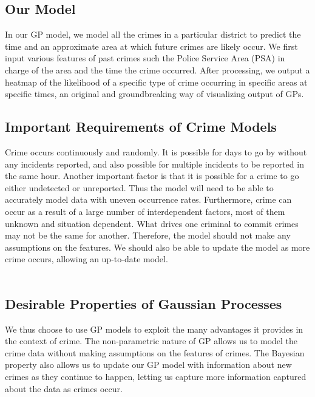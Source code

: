 \documentclass[letterpaper]{article}
\begin{document}
	\subsection{Our Model}
	
	In our GP model, we model all the crimes in a particular district to predict the time and an approximate area at which future crimes are likely occur.
	We first input various features of past crimes such the Police Service Area (PSA) in charge of the area and the time the crime occurred.
	After processing, we output a heatmap of the likelihood of a specific type of crime occurring in specific areas at specific times, an original and groundbreaking way of visualizing output of GPs.
	
	\subsection{Important Requirements of Crime Models}
	
	Crime occurs continuously and randomly. It is possible for days to go by without any incidents reported, and also possible for multiple incidents to be reported in the same hour.
	Another important factor is that it is possible for a crime to go either undetected or unreported. Thus the model will need to be able to accurately model data with uneven occurrence rates.
	Furthermore, crime can occur as a result of a large number of interdependent factors, most of them unknown and situation dependent. What drives one criminal to commit crimes may not be the same for another.
	Therefore, the model should not make any assumptions on the features. We should also be able to update the model as more crime occurs, allowing an up-to-date model.\\ \\
	
	\subsection{Desirable Properties of Gaussian Processes}
	
	We thus choose to use GP models to exploit the many advantages it provides in the context of crime.
	The non-parametric nature of GP allows us to model the crime data without making assumptions on the features of crimes.
	The Bayesian property also allows us to update our GP model with information about new crimes as they continue to happen, letting us capture more information captured about the data as crimes occur.\\ \\
\end{document}
